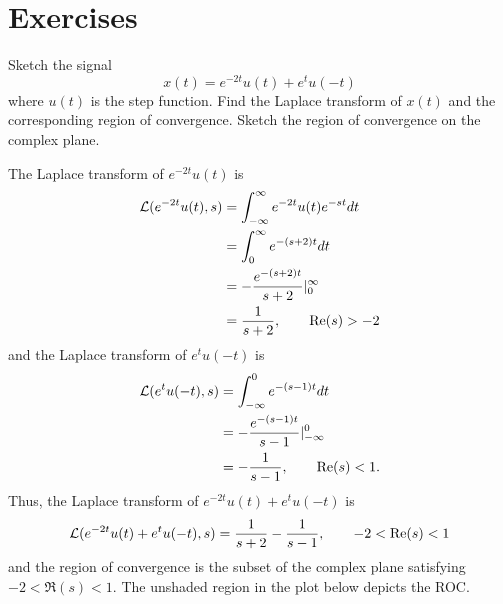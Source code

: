 \section*{Exercises}

\begin{excersizelist}

\item Sketch the signal
\[
x(t) = e^{-2t} u(t) + e^{t} u(-t)
\]
where $u(t)$ is the step function.  Find the Laplace transform of $x(t)$ and the corresponding region of convergence.  Sketch the region of convergence on the complex plane.
\begin{solution}
\begin{center}
\end{center}

The Laplace transform of $e^{-2t}u(t)$ is
\begin{align*}
\mathcal L(e^{-2t}u(t), s) &= \int_{-\infty}^{\infty} e^{-2t}u(t) e^{-st} dt \\
&= \int_{0}^{\infty} e^{-(s+2)t} dt \\
&= -\frac{e^{-(s+2)t}}{s+2} \vert_{0}^\infty \\
&= \frac{1}{s+2}, \qquad \operatorname{Re}(s) > -2
\end{align*}
and the Laplace transform of $e^{t}u(-t)$ is
\begin{align*}
\mathcal L(e^{t}u(-t), s) &= \int_{-\infty}^{0} e^{-(s-1)t} dt \\
&= -\frac{e^{-(s-1)t}}{s-1} \vert_{-\infty}^0 \\
&= -\frac{1}{s-1}, \qquad \operatorname{Re}(s) < 1.
\end{align*}
Thus, the Laplace transform of $e^{-2t} u(t) + e^{t} u(-t)$ is
\[
\mathcal L(e^{-2t} u(t) + e^{t} u(-t), s) = \frac{1}{s+2} - \frac{1}{s-1}, \qquad -2 < \operatorname{Re}(s) < 1
\]
and the region of convergence is the subset of the complex plane satisfying $-2 < \Re(s) < 1$.  The unshaded region in the plot below depicts the ROC.


\end{solution}
\end{excersizelist}

